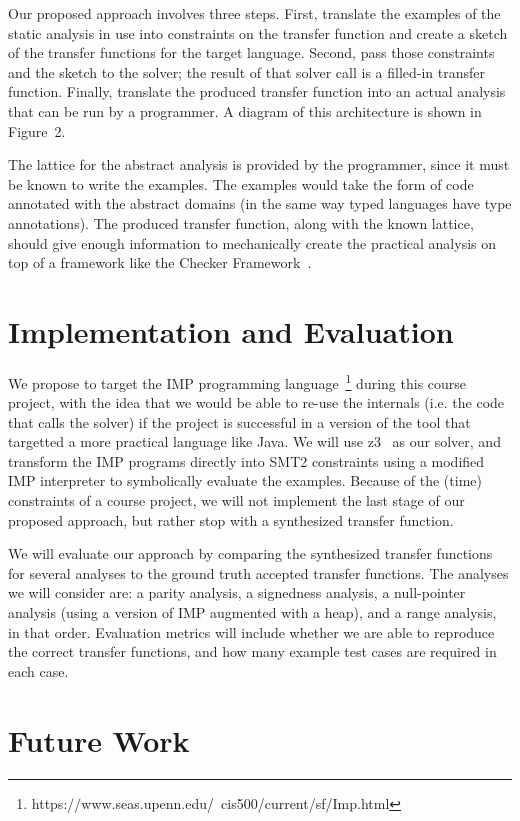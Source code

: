\documentclass[10pt,conference]{IEEEtran}
\begin{document}
Our proposed approach involves three steps.
First, translate the examples of the static analysis in
use into constraints on the transfer function and create
a sketch of the transfer functions for the target language.
Second, pass those constraints and the sketch to the solver;
the result of that solver call is a filled-in transfer
function. Finally, translate the produced transfer function
into an actual analysis that can be run by a programmer.
A diagram of this architecture is shown in Figure~2.

The lattice for the abstract analysis is provided by
the programmer, since it must be known to write the examples.
The examples would take the form of code annotated with the
abstract domains (in the same way typed languages have type annotations).
The produced transfer function, along with the known lattice,
should give enough information to mechanically create the practical
analysis on top of a framework like the Checker Framework~\cite{checker-framework}.

\section{Implementation and Evaluation}

We propose to target the IMP programming language~\footnote{https://www.seas.upenn.edu/~cis500/current/sf/Imp.html}
during this course
project, with the idea that we would be able to re-use the internals
(i.e. the code that calls the solver) if the project is successful in
a version of the tool that targetted a more practical language like Java.
We will use z3~\cite{z3} as our solver, and transform the IMP programs directly
into SMT2 constraints using a modified IMP interpreter to symbolically evaluate
the examples. Because of the (time) constraints of a course project, we will not
implement the last stage of our proposed approach, but rather stop with a
synthesized transfer function.

We will evaluate our approach by comparing the synthesized transfer
functions for several analyses to the ground truth accepted transfer
functions. The analyses we will consider are: a parity analysis,
a signedness analysis, a null-pointer analysis (using a version of
IMP augmented with a heap), and a range analysis, in that order.
Evaluation metrics will include whether we are able to reproduce
the correct transfer functions, and how many example test cases
are required in each case.

\section{Future Work}
\end{document}
